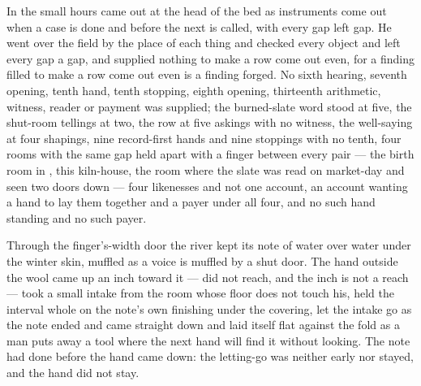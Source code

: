 In the small hours  came out at the head of the bed as instruments come out when a case is done and before the next is called, with every gap left gap. He went over the field by the place of each thing and checked every object and left every gap a gap, and supplied nothing to make a row come out even, for a finding filled to make a row come out even is a finding forged. No sixth hearing, seventh opening, tenth hand, tenth stopping, eighth opening, thirteenth arithmetic, witness, reader or payment was supplied; the burned-slate word stood at five, the shut-room tellings at two, the row at five askings with no witness, the well-saying at four shapings, nine record-first hands and nine stoppings with no tenth, four rooms with the same gap held apart with a finger between every pair --- the birth room in , this kiln-house, the room where the slate was read on market-day and  seen two doors down --- four likenesses and not one account, an account wanting a hand to lay them together and a payer under all four, and no such hand standing and no such payer.

Through the finger's-width door the river kept its note of water over water under the winter skin, muffled as a voice is muffled by a shut door. The hand outside the wool came up an inch toward it --- did not reach, and the inch is not a reach --- took a small intake from the room whose floor does not touch his, held the interval whole on the note's own finishing under the covering, let the intake go as the note ended and came straight down and laid itself flat against the fold as a man puts away a tool where the next hand will find it without looking. The note had done before the hand came down: the letting-go was neither early nor stayed, and the hand did not stay.

